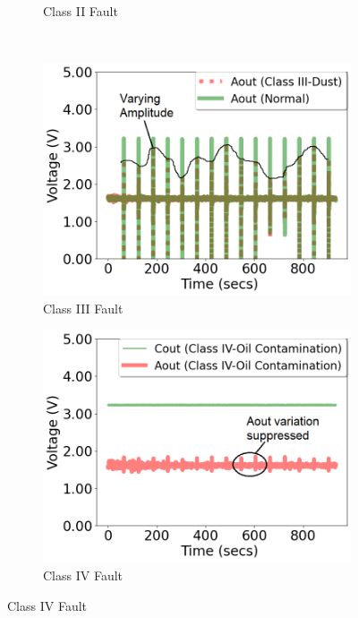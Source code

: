 \begin{figure}[b]
\begin{subfigure}[t]{0.3\textwidth}
		\caption{Class II Fault}
		\label{fig:pir_sensor_controlled_b}
	\end{subfigure}\\%
	\begin{subfigure}[t]{0.3\textwidth}
		\centering
		\includegraphics[width=\textwidth]{figures/2-PIR-Fault/normal-classIII/classIII_compared.png}
		\caption{Class III Fault}
		\label{fig:pir_sensor_controlled_c}
	\end{subfigure}
	\begin{subfigure}[t]{0.3\textwidth}
		\centering
		\includegraphics[width=\textwidth]{figures/2-PIR-Fault/normal-classIV/classIV_summary.png}
		\caption{Class IV Fault}
		\label{fig:pir_sensor_controlled_d}
	\end{subfigure}%

\end{figure}
